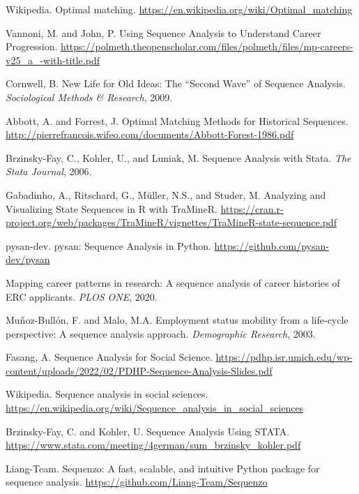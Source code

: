 \documentclass[../main.tex]{subfiles}
\begin{document}

\begin{thebibliography}{99}

Wikipedia. Optimal matching. \url{https://en.wikipedia.org/wiki/Optimal_matching}

Vannoni, M. and John, P. Using Sequence Analysis to Understand Career Progression. \url{https://polmeth.theopenscholar.com/files/polmeth/files/mp-careers-v25_a_-with-title.pdf}

Cornwell, B. New Life for Old Ideas: The ``Second Wave'' of Sequence Analysis. \textit{Sociological Methods \& Research}, 2009.

Abbott, A. and Forrest, J. Optimal Matching Methods for Historical Sequences. \url{http://pierrefrancois.wifeo.com/documents/Abbott-Forest-1986.pdf}

Brzinsky-Fay, C., Kohler, U., and Luniak, M. Sequence Analysis with Stata. \textit{The Stata Journal}, 2006.

Gabadinho, A., Ritschard, G., Müller, N.S., and Studer, M. Analyzing and Visualizing State Sequences in R with TraMineR. \url{https://cran.r-project.org/web/packages/TraMineR/vignettes/TraMineR-state-sequence.pdf}

pysan-dev. pysan: Sequence Analysis in Python. \url{https://github.com/pysan-dev/pysan}

Mapping career patterns in research: A sequence analysis of career histories of ERC applicants. \textit{PLOS ONE}, 2020.

Muñoz-Bullón, F. and Malo, M.A. Employment status mobility from a life-cycle perspective: A sequence analysis approach. \textit{Demographic Research}, 2003.

Fasang, A. Sequence Analysis for Social Science. \url{https://pdhp.isr.umich.edu/wp-content/uploads/2022/02/PDHP-Sequence-Analysis-Slides.pdf}

Wikipedia. Sequence analysis in social sciences. \url{https://en.wikipedia.org/wiki/Sequence_analysis_in_social_sciences}

Brzinsky-Fay, C. and Kohler, U. Sequence Analysis Using STATA. \url{https://www.stata.com/meeting/4german/sum_brzinsky_kohler.pdf}

Liang-Team. Sequenzo: A fast, scalable, and intuitive Python package for sequence analysis. \url{https://github.com/Liang-Team/Sequenzo}

\end{thebibliography}
\end{document}
